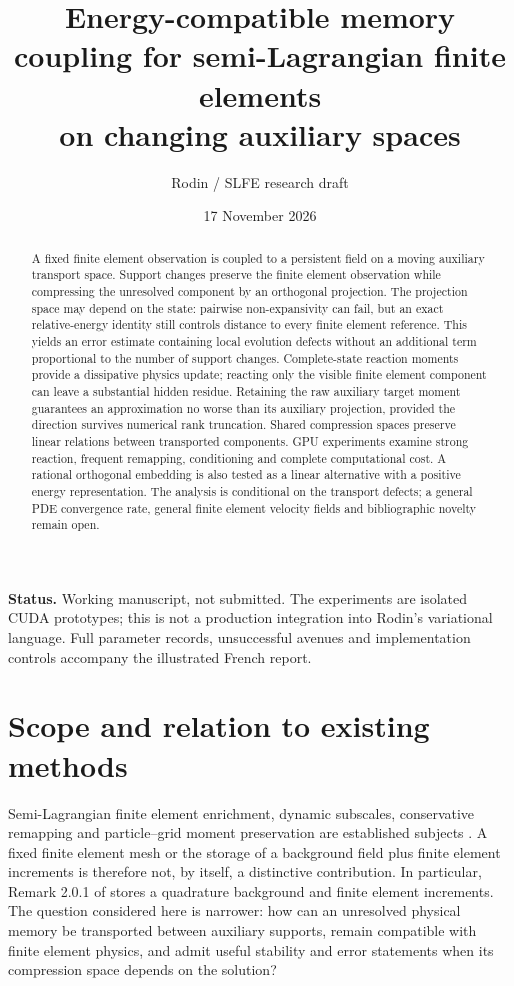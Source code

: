 \documentclass[10pt,a4paper]{article}
\title{Energy-compatible memory coupling for semi-Lagrangian finite elements\\on changing auxiliary spaces}
\author{Rodin / SLFE research draft}
\date{17 November 2026}
\begin{document}
\maketitle
\begin{abstract}
A fixed finite element observation is coupled to a persistent field on a
moving auxiliary transport space. Support changes preserve the finite
element observation while compressing the unresolved component by an
orthogonal projection. The projection space may depend on the state:
pairwise non-expansivity can fail, but an exact relative-energy identity
still controls distance to every finite element reference. This yields an
error estimate containing local evolution defects without an additional
term proportional to the number of support changes. Complete-state
reaction moments provide a dissipative physics update; reacting only the
visible finite element component can leave a substantial hidden residue.
Retaining the raw auxiliary target moment guarantees an approximation
no worse than its auxiliary projection, provided the direction survives
numerical rank truncation. Shared compression spaces preserve linear
relations between transported components. GPU experiments examine strong reaction, frequent remapping,
conditioning and complete computational cost. A rational orthogonal
embedding is also tested as a linear alternative with a positive energy
representation. The analysis is conditional on the transport defects;
a general PDE convergence rate, general finite element velocity fields
and bibliographic novelty remain open.
\end{abstract}
\noindent\textbf{Status.} Working manuscript, not submitted. The experiments
are isolated CUDA prototypes; this is not a production integration into
Rodin's variational language. Full parameter records, unsuccessful avenues
and implementation controls accompany the illustrated French report.

\section{Scope and relation to existing methods}
Semi-Lagrangian finite element enrichment, dynamic subscales, conservative
remapping and particle--grid moment preservation are established subjects
\cite{ouardghi,codina,simon,adams,keith}. A fixed finite element mesh or the
storage of a background field plus finite element increments is therefore
not, by itself, a distinctive contribution. In particular, Remark 2.0.1 of
\cite{keith} stores a quadrature background and finite element increments.
The question considered here is narrower: how can an unresolved physical
memory be transported between auxiliary supports, remain compatible with
finite element physics, and admit useful stability and error statements
when its compression space depends on the solution?
\end{document}
